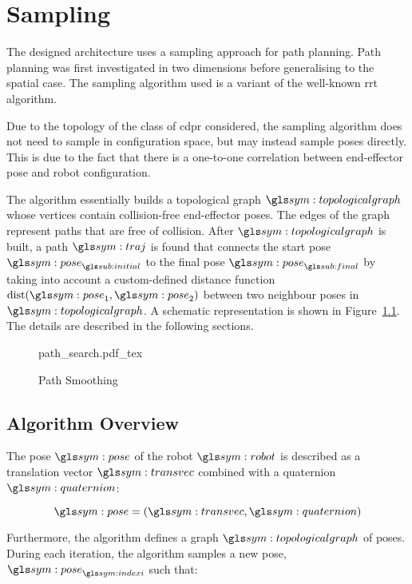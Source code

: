 \chapter{Sampling}%
\label{chap:sampling}

	The designed architecture uses a sampling approach for path
	planning. Path planning was first investigated in two dimensions before
	generalising to the spatial case. The sampling algorithm
	used is a variant of the well-known \gls{rrt} algorithm.

	Due to the topology of the class of \gls{cdpr} considered, the sampling
	algorithm does not need to sample in configuration space, but may instead
	sample poses directly. This is due to the fact that there is a one-to-one
	correlation between end-effector pose and robot configuration.

	The algorithm essentially builds a topological graph $\topologicalgraph$
	whose vertices contain collision-free end-effector poses. The edges of the
	graph represent paths that are free of collision. After $\topologicalgraph$
	is built, a path $\pathsym$ is found that connects the start pose
	$\pose_{\initial}$ to the final pose $\pose_{\final}$ by taking into account
	a custom-defined distance function $\dist(\pose_1, \pose_2)$ between two
	neighbour poses in $\topologicalgraph$. A schematic representation is shown
	in Figure~\ref{fig:path_search}. The details are described in the following
	sections.

	\begin{figure}[hb]
		\centering
		\def\svgwidth{\columnwidth}
		{path_search.pdf_tex}
		\caption{Path Smoothing}%
		\label{fig:path_search}
	\end{figure}

	\section{Algorithm Overview}%
	\label{sec:algorithm_overview}

		The pose $\pose$ of the robot $\robot$ is described as a translation
		vector $\transvec$ combined with a quaternion $\quaternion$:

		\begin{equation}
			\pose = (\transvec, \quaternion)
		\end{equation}

		Furthermore, the algorithm defines a graph $\topologicalgraph$ of poses.
		During each iteration, the algorithm samples a new pose,
		$\pose_{\indexi}$ such that:

